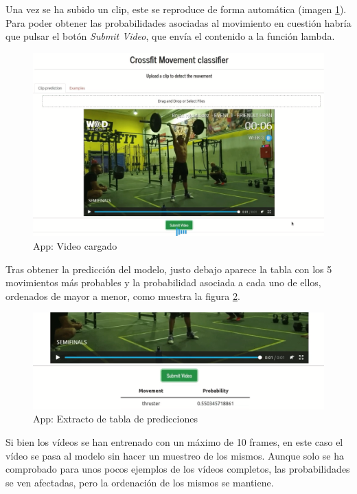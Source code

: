 Una vez se ha subido un clip, este se reproduce de forma automática (imagen \ref{app_2}). Para poder obtener las probabilidades asociadas al movimiento en cuestión habría que pulsar el botón \textit{Submit Video}, que envía el contenido a la función lambda.

\begin{figure}[H]
    \centering
		\includegraphics[width=\textwidth]{figs/app_2.png}
\caption{App: Video cargado}\label{app_2}
\end{figure}

Tras obtener la predicción del modelo, justo debajo aparece la tabla con los 5 movimientos más probables y la probabilidad asociada a cada uno de ellos, ordenados de mayor a menor, como muestra la figura \ref{app_3}.

\begin{figure}[H]
    \centering
		\includegraphics[width=\textwidth]{figs/app_3.png}
\caption{App: Extracto de tabla de predicciones}\label{app_3}
\end{figure}

Si bien los vídeos se han entrenado con un máximo de 10 frames, en este caso el vídeo se pasa al modelo sin hacer un muestreo de los mismos. Aunque solo se ha comprobado para unos pocos ejemplos de los vídeos completos, las probabilidades se ven afectadas, pero la ordenación de los mismos se mantiene.

